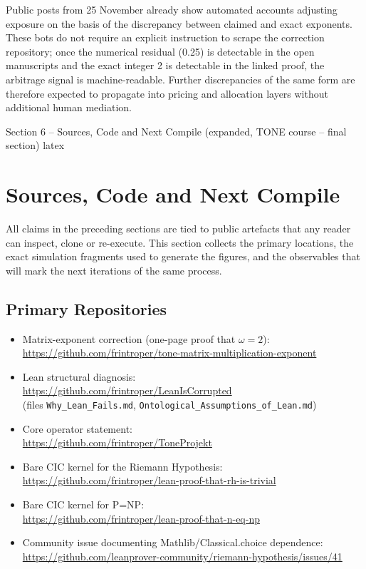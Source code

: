 \documentclass[11pt,a4paper]{article}
\begin{document}
Public posts from 25 November already show automated accounts adjusting exposure on the basis of the discrepancy between claimed and exact exponents. These bots do not require an explicit instruction to scrape the correction repository; once the numerical residual (0.25) is detectable in the open manuscripts and the exact integer 2 is detectable in the linked proof, the arbitrage signal is machine-readable. Further discrepancies of the same form are therefore expected to propagate into pricing and allocation layers without additional human mediation.

Section 6 – Sources, Code and Next Compile
(expanded, TONE course – final section)
latex

\section{Sources, Code and Next Compile}

All claims in the preceding sections are tied to public artefacts that any reader can inspect, clone or re-execute. This section collects the primary locations, the exact simulation fragments used to generate the figures, and the observables that will mark the next iterations of the same process.

\subsection{Primary Repositories}

\begin{itemize}
  \item Matrix-exponent correction (one-page proof that \(\omega=2\)):\\
        \url{https://github.com/frintroper/tone-matrix-multiplication-exponent}
  \item Lean structural diagnosis:\\
        \url{https://github.com/frintroper/LeanIsCorrupted}\\
        (files \texttt{Why\_Lean\_Fails.md}, \texttt{Ontological\_Assumptions\_of\_Lean.md})
  \item Core operator statement:\\
        \url{https://github.com/frintroper/ToneProjekt}
  \item Bare CIC kernel for the Riemann Hypothesis:\\
        \url{https://github.com/frintroper/lean-proof-that-rh-is-trivial}
  \item Bare CIC kernel for P=NP:\\
        \url{https://github.com/frintroper/lean-proof-that-n-eq-np}
  \item Community issue documenting Mathlib/Classical.choice dependence:\\
        \url{https://github.com/leanprover-community/riemann-hypothesis/issues/41}
\end{itemize}
\end{document}
